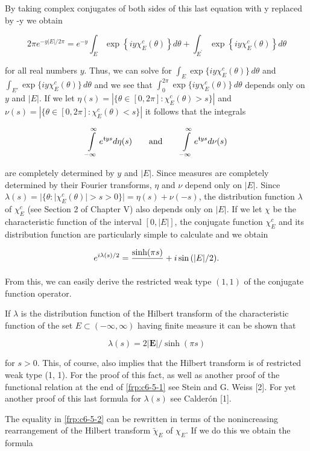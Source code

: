 By taking complex conjugates of both sides of this last equation with y replaced by -y we obtain

\[
2\pi e^{-y|E|/2\pi}=e^{-y}\int_{E}\exp\left\{i y\chi_{E}^{c}(\theta)\right\}d\theta+\int_{E^{\prime}}\exp\left\{i y\chi_{E}^{c}(\theta)\right\}d\theta
\]

for all real numbers $y$. Thus, we can solve for $\int_E \exp \{iy\chi_E^c(\theta)\} \, d\theta$ and $\int_{E'} \exp \{iy\chi_E^c(\theta)\} \, d\theta$ and we see that $\int_0^{2\pi} \exp \{iy\chi_E^c(\theta)\} \, d\theta$ depends only on $y$ and $|E|$. If we let $\eta(s) = |\{\theta \in [0, 2\pi]: \chi_E^c(\theta) > s\}|$ and $\nu(s) = |\{\theta \in [0, 2\pi]: \chi_E^c(\theta) < s\}|$ it follows that the integrals

\[
\intop_{-\infty}^{\infty}e^{\mathfrak{t}y s}d\eta(s)\qquad\text{and}\qquad\intop_{-\infty}^{\infty}e^{\mathfrak{t}y s}d\nu(s)
\]

are completely determined by $y$ and $|E|$. Since measures are completely determined by their Fourier transforms, $\eta$ and $\nu$ depend only on $|E|$. Since $\lambda(s) = |\{\theta: |\chi_E^c(\theta)| > s > 0\}| = \eta(s) + \nu(-s)$, the distribution function $\lambda$ of $\chi_E^c$ (see Section 2 of Chapter V) also depends only on $|E|$. If we let $\chi$ be the characteristic function of the interval $[0, |E|]$, the conjugate function $\chi_E^c$ and its distribution function are particularly simple to calculate and we obtain

\[
e^{i\lambda(s)/2}=\frac{\text{sinh}{(\pi s)}}{}+i\sin{(|E|/2)}\notag.
\]

From this, we can easily derive the restricted weak type $(1,1)$ of the conjugate function operator.

 If $\lambda$ is the distribution function of the Hilbert transform of the characteristic function of the set $E \subset (-\infty, \infty)$ having finite measure it can be shown that

\[
\lambda(s)=2\left|\boldsymbol{E}\right|/\sinh\left(\pi s\right)
\]

for $s > 0$. This, of course, also implies that the Hilbert transform is of restricted weak type (1, 1). For the proof of this fact, as well as another proof of the functional relation at the end of \eqref{frp:c6-5-1} see Stein and G. Weiss [2]. For yet another proof of this last formula for $\lambda(s)$ see Calderón [1].

 The equality in \eqref{frp:c6-5-2} can be rewritten in terms of the nonincreasing rearrangement of the Hilbert transform $\tilde{\chi}_{E}$ of $\chi_{E}$. If we do this we obtain the formula

